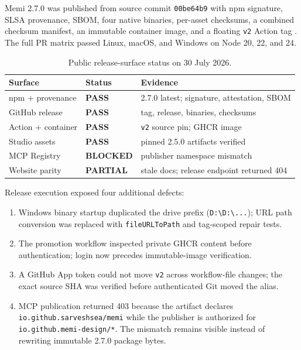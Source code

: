 \documentclass[10pt,twocolumn]{article}
\newcommand{\code}[1]{\texttt{\small #1}}
\newcommand{\pass}{\textcolor{MemiGreen}{\textbf{PASS}}}
\newcommand{\blocked}{\textcolor{MemiRed}{\textbf{BLOCKED}}}
\newcommand{\partialstatus}{\textcolor{MemiAmber}{\textbf{PARTIAL}}}
\begin{document}
Memi 2.7.0 was published from source commit
\code{00be64b9} with npm signature, SLSA provenance, SBOM, four
native binaries, per-asset checksums, a combined checksum manifest, an
immutable container image, and a floating \code{v2} Action tag
\cite{memi2026release}. The full PR matrix passed Linux, macOS, and Windows on
Node 20, 22, and 24.

\begin{table}[t]
\centering
\caption{Public release-surface status on 30 July 2026.}
\label{tab:release}
\scriptsize
\begin{tabularx}{\columnwidth}{@{}p{}p{}X@{}}
\toprule
Surface & Status & Evidence \\
\midrule
npm + provenance & \pass & 2.7.0 latest; signature, attestation, SBOM \\
GitHub release & \pass & tag, release, binaries, checksums \\
Action + container & \pass & \code{v2} source pin; GHCR image \\
Studio assets & \pass & pinned 2.5.0 artifacts verified \\
MCP Registry & \blocked & publisher namespace mismatch \\
Website parity & \partialstatus & stale docs; release endpoint returned 404 \\
\bottomrule
\end{tabularx}
\end{table}

Release execution exposed four additional defects:

\begin{enumerate}
  \item Windows binary startup duplicated the drive prefix
  (\code{D:\textbackslash D:\textbackslash...}); URL path conversion was
  replaced with \code{fileURLToPath} and tag-scoped repair tests.
  \item The promotion workflow inspected private GHCR content before
  authentication; login now precedes immutable-image verification.
  \item A GitHub App token could not move \code{v2} across workflow-file
  changes; the exact source SHA was verified before authenticated Git moved
  the alias.
  \item MCP publication returned 403 because the artifact declares
  \code{io.github.sarveshsea/memi} while the publisher is authorized for
  \code{io.github.memi-design/*}. The mismatch remains visible instead of
  rewriting immutable 2.7.0 package bytes.
\end{enumerate}
\end{document}
